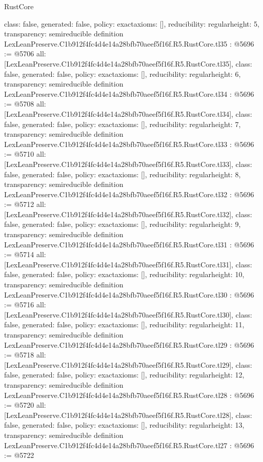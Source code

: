 \begin{lexlean}{RustCore}
\begin{coremodule}
{  class: false,
  generated: false,
  policy: exact{axioms: []},
  reducibility: regular{height: 5},
  transparency: semireducible
}
definition LexLeanPreserve.C1b912f4fc4d4e14a28bfb70aeef5f16f.R5.RustCore.tl35 : @5696 := @5706 {
  all: [LexLeanPreserve.C1b912f4fc4d4e14a28bfb70aeef5f16f.R5.RustCore.tl35],
  class: false,
  generated: false,
  policy: exact{axioms: []},
  reducibility: regular{height: 6},
  transparency: semireducible
}
definition LexLeanPreserve.C1b912f4fc4d4e14a28bfb70aeef5f16f.R5.RustCore.tl34 : @5696 := @5708 {
  all: [LexLeanPreserve.C1b912f4fc4d4e14a28bfb70aeef5f16f.R5.RustCore.tl34],
  class: false,
  generated: false,
  policy: exact{axioms: []},
  reducibility: regular{height: 7},
  transparency: semireducible
}
definition LexLeanPreserve.C1b912f4fc4d4e14a28bfb70aeef5f16f.R5.RustCore.tl33 : @5696 := @5710 {
  all: [LexLeanPreserve.C1b912f4fc4d4e14a28bfb70aeef5f16f.R5.RustCore.tl33],
  class: false,
  generated: false,
  policy: exact{axioms: []},
  reducibility: regular{height: 8},
  transparency: semireducible
}
definition LexLeanPreserve.C1b912f4fc4d4e14a28bfb70aeef5f16f.R5.RustCore.tl32 : @5696 := @5712 {
  all: [LexLeanPreserve.C1b912f4fc4d4e14a28bfb70aeef5f16f.R5.RustCore.tl32],
  class: false,
  generated: false,
  policy: exact{axioms: []},
  reducibility: regular{height: 9},
  transparency: semireducible
}
definition LexLeanPreserve.C1b912f4fc4d4e14a28bfb70aeef5f16f.R5.RustCore.tl31 : @5696 := @5714 {
  all: [LexLeanPreserve.C1b912f4fc4d4e14a28bfb70aeef5f16f.R5.RustCore.tl31],
  class: false,
  generated: false,
  policy: exact{axioms: []},
  reducibility: regular{height: 10},
  transparency: semireducible
}
definition LexLeanPreserve.C1b912f4fc4d4e14a28bfb70aeef5f16f.R5.RustCore.tl30 : @5696 := @5716 {
  all: [LexLeanPreserve.C1b912f4fc4d4e14a28bfb70aeef5f16f.R5.RustCore.tl30],
  class: false,
  generated: false,
  policy: exact{axioms: []},
  reducibility: regular{height: 11},
  transparency: semireducible
}
definition LexLeanPreserve.C1b912f4fc4d4e14a28bfb70aeef5f16f.R5.RustCore.tl29 : @5696 := @5718 {
  all: [LexLeanPreserve.C1b912f4fc4d4e14a28bfb70aeef5f16f.R5.RustCore.tl29],
  class: false,
  generated: false,
  policy: exact{axioms: []},
  reducibility: regular{height: 12},
  transparency: semireducible
}
definition LexLeanPreserve.C1b912f4fc4d4e14a28bfb70aeef5f16f.R5.RustCore.tl28 : @5696 := @5720 {
  all: [LexLeanPreserve.C1b912f4fc4d4e14a28bfb70aeef5f16f.R5.RustCore.tl28],
  class: false,
  generated: false,
  policy: exact{axioms: []},
  reducibility: regular{height: 13},
  transparency: semireducible
}
definition LexLeanPreserve.C1b912f4fc4d4e14a28bfb70aeef5f16f.R5.RustCore.tl27 : @5696 := @5722 {
}
\end{coremodule}
\end{lexlean}
